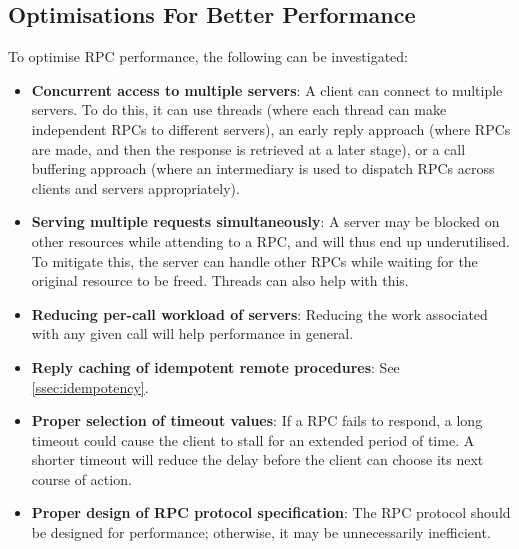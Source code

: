 \subsection{Optimisations For Better Performance}
To optimise RPC performance, the following can be investigated: \begin{itemize}
\item \textbf{Concurrent access to multiple servers}: A client can connect to multiple servers. To do this, it can use threads (where each thread can make independent RPCs to different servers), an early reply approach (where RPCs are made, and then the response is retrieved at a later stage), or a call buffering approach (where an intermediary is used to dispatch RPCs across clients and servers appropriately).
\item \textbf{Serving multiple requests simultaneously}: A server may be blocked on other resources while attending to a RPC, and will thus end up underutilised. To mitigate this, the server can handle other RPCs while waiting for the original resource to be freed. Threads can also help with this.
\item \textbf{Reducing per-call workload of servers}: Reducing the work associated with any given call will help performance in general.
\item \textbf{Reply caching of idempotent remote procedures}: See \autoref{ssec:idempotency}.
\item \textbf{Proper selection of timeout values}: If a RPC fails to respond, a long timeout could cause the client to stall for an extended period of time. A shorter timeout will reduce the delay before the client can choose its next course of action.
\item \textbf{Proper design of RPC protocol specification}: The RPC protocol should be designed for performance; otherwise, it may be unnecessarily inefficient.
\end{itemize}